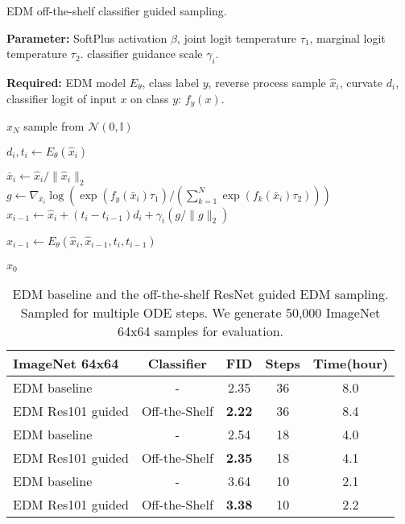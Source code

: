 \documentclass{article}
\theoremstyle{definition}
\begin{document}
\begin{algorithm}
\caption{EDM off-the-shelf classifier guided sampling.}\label{alg:edm_classifier_guidance}

\begin{algorithmic}
\State \textbf{Parameter:} SoftPlus activation $\beta$, joint logit temperature $\tau_1$, marginal logit temperature $\tau_2$. classifier guidance scale $\gamma_i$.

\State \textbf{Required:} EDM model $E_\theta$, class label $y$, reverse process sample $\hat{x}_i$, curvate $d_i$, classifier logit of input $x$ on class $y$: $f_y(x)$. 

\State $\hat{x}_N$ sample from $\mathcal{N}(0,\mathbb{I})$ 

\State $ d_i,t_i \gets  E_\theta(\hat{x}_i) $  

\State $ \bar{x}_i \gets \hat{x}_i / \lVert \hat{x}_i \rVert_2 $
\State $ g \gets \nabla_{\bar{x}_i} \log( \exp(f_y(\bar{x}_i)\tau_1) / (\sum^N_{k=1} \exp(f_k(\bar{x}_i)\tau_2)) ) $
\State $ \hat{x}_{i-1} \gets \hat{x}_i + (t_i-t_{i-1})d_i + \gamma_i (g / \lVert g \rVert_2) $ 

    \State $\hat{x}_{i-1} \gets E_\theta(\hat{x}_i,\hat{x}_{i-1},t_i,t_{i-1})  $
\EndIf

\EndFor 
\State \Return $\hat{x}_0$
\end{algorithmic}
\end{algorithm}


\begin{table}[h!]
\caption{EDM \citep{karras2022edm} baseline and the off-the-shelf ResNet guided EDM sampling. Sampled for multiple ODE steps. We generate 50,000 ImageNet 64x64 samples for evaluation.}
\label{table:ode_edm_results}
\begin{center}
\begin{small}
\begin{sc}
\begin{tabular}{lcccc}
\toprule
ImageNet 64x64 & Classifier & FID & Steps & Time(hour) \\
\midrule
EDM baseline     & -  & 2.35 & 36 & 8.0   \\ 
EDM Res101 guided & Off-the-Shelf & \bf{2.22} & 36 & 8.4 \\ 
EDM baseline     & -  & 2.54 & 18 & 4.0 \\ 
EDM Res101 guided  & Off-the-Shelf & \bf{2.35} & 18 & 4.1\\ 
EDM baseline     & -  & 3.64 & 10 & 2.1 \\ 
EDM Res101 guided  & Off-the-Shelf & \bf{3.38} & 10 & 2.2\\ 
\bottomrule
\end{tabular}
\end{sc}
\end{small}
\end{center}
\end{table}
\end{document}

